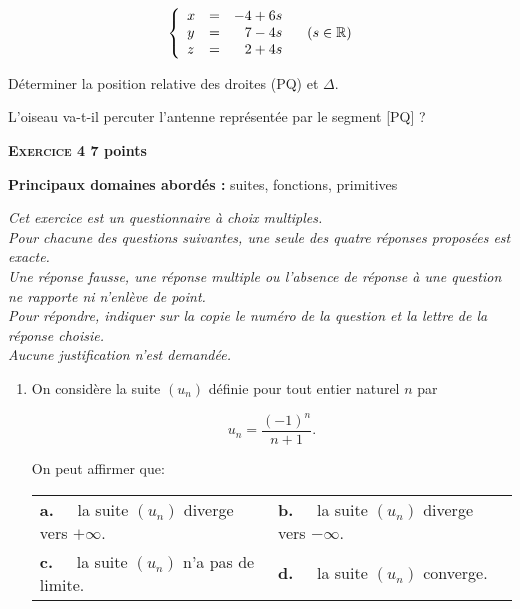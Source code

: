 \documentclass[10pt,a4paper]{article}
\newcommand{\R}{\mathbb{R}}
\begin{document}
\begin{enumerate}
\[\left\{\begin{array}{l c r}
x & =& -4 +6s\\ y &=& 7 - 4s\\z &=& 2 + 4s
\end{array}\right.\quad (s \in \R)\]

Déterminer la position relative des droites (PQ) et $\Delta$.

L'oiseau va-t-il percuter l'antenne représentée par le segment [PQ] ?

\end{enumerate}

\bigskip

\textbf{\textsc{Exercice 4} \hfill 7 points}

\textbf{Principaux domaines abordés :} suites, fonctions, primitives

\medskip

\emph{Cet exercice est un questionnaire à choix multiples.\\
Pour chacune des questions suivantes, une seule des quatre réponses proposées est exacte.\\
Une réponse fausse, une réponse multiple ou l'absence de réponse à une question ne rapporte ni n'enlève de point.\\
Pour répondre, indiquer sur la copie le numéro de la question et la lettre de la réponse choisie.\\
Aucune justification n'est demandée.}

\medskip

\begin{enumerate}
\item On considère la suite $\left(u_n\right)$ définie pour tout entier naturel $n$ par

\[u_n  = \dfrac{(- 1)^n}{n + 1}.\]

On peut affirmer que:
\begin{center}
\begin{tabularx}{\linewidth}{X X}
\textbf{a.~~} la suite $\left(u_n\right)$ diverge vers $+\infty$. &\textbf{b.~~} la suite $\left(u_n\right)$ diverge vers $-\infty$.\\
\textbf{c.~~}  la suite $\left(u_n\right)$ n'a pas de limite. &\textbf{d.~~} la suite $\left(u_n\right)$ converge.
\end{tabularx}
\end{center}

\begin{center} \decosix \decosix \decosix  \end{center}
\end{enumerate}
\end{document}
